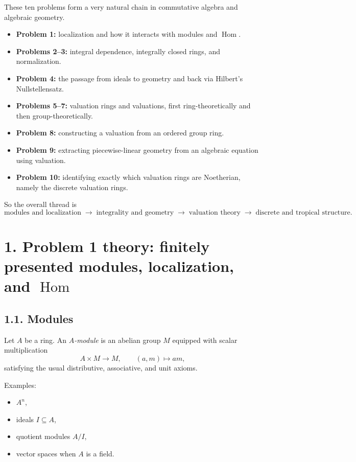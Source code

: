 \documentclass[12pt,a4paper]{article}
\theoremstyle{notespace}
\begin{document}
These ten problems form a very natural chain in commutative algebra and algebraic geometry.

\begin{itemize}
	\item \textbf{Problem 1:} localization and how it interacts with modules and \(\operatorname{Hom}\).
	\item \textbf{Problems 2--3:} integral dependence, integrally closed rings, and normalization.
	\item \textbf{Problem 4:} the passage from ideals to geometry and back via Hilbert's Nullstellensatz.
	\item \textbf{Problems 5--7:} valuation rings and valuations, first ring-theoretically and then group-theoretically.
	\item \textbf{Problem 8:} constructing a valuation from an ordered group ring.
	\item \textbf{Problem 9:} extracting piecewise-linear geometry from an algebraic equation using valuation.
	\item \textbf{Problem 10:} identifying exactly which valuation rings are Noetherian, namely the discrete valuation rings.
\end{itemize}

So the overall thread is
\[
\text{modules and localization}
\;\longrightarrow\;
\text{integrality and geometry}
\;\longrightarrow\;
\text{valuation theory}
\;\longrightarrow\;
\text{discrete and tropical structure}.
\]

\bigskip

\section{1. Problem 1 theory: finitely presented modules, localization, and \texorpdfstring{$\operatorname{Hom}$}{Hom}}

\subsection*{1.1. Modules}

Let \(A\) be a ring. An \emph{\(A\)-module} is an abelian group \(M\) equipped with scalar multiplication
\[
A\times M \to M,\qquad (a,m)\mapsto am,
\]
satisfying the usual distributive, associative, and unit axioms.

Examples:
\begin{itemize}
	\item \(A^n\),
	\item ideals \(I\subseteq A\),
	\item quotient modules \(A/I\),
	\item vector spaces when \(A\) is a field.
\end{itemize}
\end{document}
